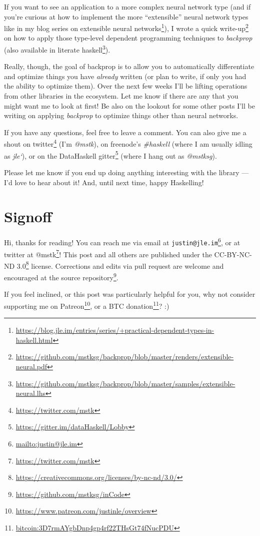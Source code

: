 \documentclass[]{article}
\renewcommand{\href}[2]{#2\footnote{\url{#1}}}
\begin{document}
If you want to see an application to a more complex neural network type (and if
you're curious at how to implement the more ``extensible'' neural network types
like in my
\href{https://blog.jle.im/entries/series/+practical-dependent-types-in-haskell.html}{blog
series on extensible neural networks}), I wrote
\href{https://github.com/mstksg/backprop/blob/master/renders/extensible-neural.pdf}{a
quick write-up} on how to apply those type-level dependent programming
techniques to \emph{backprop} (also available in
\href{https://github.com/mstksg/backprop/blob/master/samples/extensible-neural.lhs}{literate
haskell}).

Really, though, the goal of backprop is to allow you to automatically
differentiate and optimize things you have \emph{already} written (or plan to
write, if only you had the ability to optimize them). Over the next few weeks
I'll be lifting operations from other libraries in the ecosystem. Let me know if
there are any that you might want me to look at first! Be also on the lookout
for some other posts I'll be writing on applying \emph{backprop} to optimize
things other than neural networks.

If you have any questions, feel free to leave a comment. You can also give me a
shout on \href{https://twitter.com/mstk}{twitter} (I'm \emph{@mstk}), on
freenode's \emph{\#haskell} (where I am usually idling as \emph{jle`}), or on
the \href{https://gitter.im/dataHaskell/Lobby}{DataHaskell gitter} (where I hang
out as \emph{@mstksg}).

Please let me know if you end up doing anything interesting with the library ---
I'd love to hear about it! And, until next time, happy Haskelling!

\section{Signoff}\label{signoff}

Hi, thanks for reading! You can reach me via email at
\href{mailto:justin@jle.im}{\nolinkurl{justin@jle.im}}, or at twitter at
\href{https://twitter.com/mstk}{@mstk}! This post and all others are published
under the \href{https://creativecommons.org/licenses/by-nc-nd/3.0/}{CC-BY-NC-ND
3.0} license. Corrections and edits via pull request are welcome and encouraged
at \href{https://github.com/mstksg/inCode}{the source repository}.

If you feel inclined, or this post was particularly helpful for you, why not
consider \href{https://www.patreon.com/justinle/overview}{supporting me on
Patreon}, or a \href{bitcoin:3D7rmAYgbDnp4gp4rf22THsGt74fNucPDU}{BTC donation}?
:)
\end{document}
